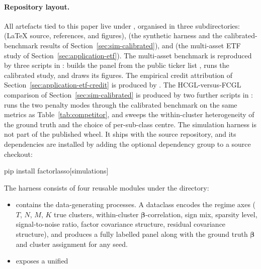 \documentclass[article]{jss}
\begin{document}
\begin{appendix}
\paragraph{Repository layout.}
All artefacts tied to this paper live under
, organised in three subdirectories:
 (LaTeX source, references, and figures),
 (the synthetic harness and the
calibrated-benchmark results of Section~\ref{sec:sim-calibrated}), and
 (the multi-asset ETF study of
Section~\ref{sec:application-etf}). The multi-asset benchmark is
reproduced by three scripts in :
 builds the panel from the public ticker
list ,  runs
the calibrated study, and  draws its
figures. The empirical credit attribution of
Section~\ref{sec:application-etf-credit} is produced by
. The HCGL-versus-FCGL comparison of
Section~\ref{sec:sim-calibrated} is produced by two further scripts in
:  runs the two
penalty modes through the calibrated benchmark on the same metrics as
Table~\ref{tab:competitor}, and  sweeps
the within-cluster heterogeneity of the ground truth and the choice of
per-sub-class centre. The simulation harness is not part of the
published  wheel. It ships with the source repository,
and its dependencies are installed by adding the 
optional dependency group to a source checkout:
%
\begin{CodeChunk}
	\begin{CodeInput}
pip install factorlasso[simulations]
	\end{CodeInput}
\end{CodeChunk}
%
The harness consists of four reusable modules under the
 directory:
%
\begin{itemize}
	\item {} contains the data-generating processes.
	A  dataclass encodes the regime axes ($T$, $N$, $M$,
	$K$ true clusters, within-cluster $\bm{\beta}$-correlation, sign mix,
	sparsity level, signal-to-noise ratio, factor covariance structure,
	residual covariance structure), and 
	produces a fully labelled  panel along with the ground
	truth $\bm{\beta}$ and cluster assignment for any seed.
	\item {} exposes a unified

\end{itemize}
\end{appendix}
\end{document}
